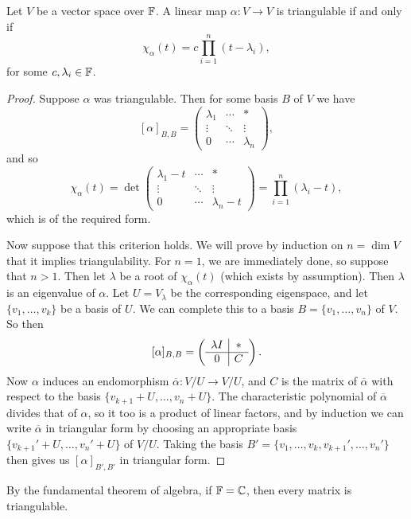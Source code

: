 \documentclass[a4paper]{scrartcl}
\begin{document}
\begin{theorem}
    Let $V$ be a vector space over $\mathbb{F}$.
    A linear map $\alpha: V \rightarrow V$ is triangulable if and only if
    $$
    \chi_{\alpha}(t) = c \prod_{i = 1}^n (t - \lambda_i),
    $$
    for some $c, \lambda_i\in \mathbb{F}$.
\end{theorem}
\begin{proof}
    Suppose $\alpha$ was triangulable. Then for some basis $B$ of $V$ we have
    $$
    [\alpha]_{B, B} = \begin{pmatrix}
        \lambda_1 & \cdots & * \\
        \vdots & \ddots & \vdots \\
        0 & \cdots & \lambda_n
    \end{pmatrix}, 
    $$
    and so
    $$
    \chi_{\alpha}(t) = \det  \begin{pmatrix}
        \lambda_1 - t & \cdots & * \\
        \vdots & \ddots & \vdots \\
        0 & \cdots & \lambda_n - t
    \end{pmatrix} = \prod_{i = 1}^n(\lambda_i - t),
    $$
    which is of the required form.

    Now suppose that this criterion holds. We will prove by induction on $n = \dim V$ that it implies triangulability. For $n = 1$, we are immediately done, so suppose that $n > 1$. Then let $\lambda$ be a root of $\chi_{\alpha}(t)$ (which exists by assumption). Then $\lambda$ is an eigenvalue of $\alpha$. Let $U = V_\lambda$ be the corresponding eigenspace, and let $\{v_1, \dots, v_k\}$ be a basis of $U$. We can complete this to a basis $B = \{v_1, \dots, v_n\}$ of $V$. So then
    $$
    [\alpha]_{B, B} = \left(\begin{array}{ c | c }
                \lambda I & *\\
                \hline
                0 & C
              \end{array}\right).
    $$
    Now $\alpha$ induces an endomorphism $\overline{\alpha} : V / U \rightarrow V / U$, and $C$ is the matrix of $\overline{\alpha}$ with respect to the basis $\{v_{k + 1} + U, \dots, v_n + U\}$. The characteristic polynomial of $\overline{\alpha}$ divides that of $\alpha$, so it too is a product of linear factors, and by induction we can write $\overline{\alpha}$ in triangular form by choosing an appropriate basis $\{v_{k + 1}' + U, \dots, v_n' + U\}$ of $V/U$. Taking the basis $B' = \{v_1, \dots, v_k, v_{k + 1}', \dots, v_n'\}$ then gives us $[\alpha]_{B', B'}$ in triangular form.
\end{proof}
\begin{remark}
    By the fundamental theorem of algebra, if $\mathbb{F} = \mathbb{C}$, then every matrix is triangulable.
\end{remark}
\end{document}
